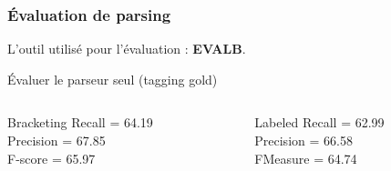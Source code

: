 \documentclass{beamer}
\begin{document}
\begin{frame}
\frametitle{\'Evaluation de parsing}
\pause
\begin{block}{}
 L'outil utilis\'e pour l'\'evaluation : \textbf{EVALB}.
\end{block}
\pause

\begin{block}{\'Evaluer le parseur seul (tagging gold)}
\begin{columns}[t]
\begin{column}{5cm}
\begin{block}{Bracketing}
Recall         =  64.19
\\
Precision      =  67.85
\\
F-score       =  65.97
\end{block}
\end{column}
\begin{column}{5cm}
\begin{block}{Labeled}
Recall         =  62.99
\\
Precision      =  66.58
\\
FMeasure       =  64.74
\end{block}
\end{column}
\end{columns}
\end{block}

\end{frame}
\end{document}
